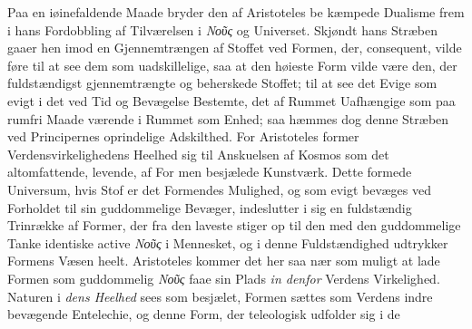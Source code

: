 \documentclass[12pt,a4paper]{book}
\newcommand{\gk}[1]{\textit{#1}}
\begin{document}
Paa en iøinefaldende Maade bryder den af Aristoteles be\-%
kæmpede Dualisme frem i hans Fordobbling af Tilværelsen i
\gk{Νοῦς} og Universet. Skjøndt hans Stræben gaaer hen imod
en Gjennemtrængen af Stoffet ved Formen, der, consequent,
vilde føre til at see dem som uadskillelige, saa at den høieste
Form vilde være den, der fuldstændigst gjennemtrængte og
beherskede Stoffet; til at see det Evige som evigt i det ved Tid
og Bevægelse Bestemte, det af Rummet Uafhængige som paa
rumfri Maade værende i Rummet som Enhed; saa hæmmes
dog denne Stræben ved Principernes oprindelige Adskilthed.
For Aristoteles former Verdensvirkelighedens Heelhed sig til
Anskuelsen af Kosmos som det altomfattende, levende, af For\-%
men besjælede Kunstværk. Dette formede Universum, hvis
Stof er det Formendes Mulighed, og som evigt bevæges ved
Forholdet til sin guddommelige Bevæger, indeslutter i sig en
fuldstændig Trinrække af Former, der fra den laveste stiger op
til den med den guddommelige Tanke identiske active \gk{Νοῦς}
i Mennesket, og i denne Fuldstændighed udtrykker Formens
Væsen heelt. Aristoteles kommer det her saa nær som muligt
at lade Formen som guddommelig \gk{Νοῦς} faae sin Plads \emph{in\-%
denfor} Verdens Virkelighed. Naturen i \emph{dens Heelhed} sees
som besjælet, Formen sættes som Verdens indre bevægende
Entelechie, og denne Form, der teleologisk udfolder sig i de
\end{document}

